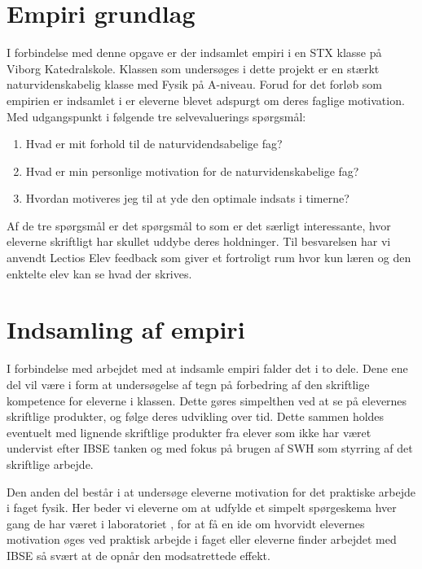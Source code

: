 \section{Empiri grundlag}
I forbindelse med denne opgave er der indsamlet empiri i en STX klasse på Viborg Katedralskole. Klassen som undersøges i dette projekt er en stærkt naturvidenskabelig klasse med Fysik på A-niveau. Forud for det forløb som empirien er indsamlet i er eleverne blevet adspurgt om deres faglige motivation. Med udgangspunkt i følgende tre selvevaluerings spørgsmål:
\begin{enumerate}
	\item Hvad er mit forhold til de naturvidendsabelige fag?
	\item Hvad er min personlige motivation for de naturvidenskabelige fag?
	\item Hvordan motiveres jeg til at yde den optimale indsats i timerne?
\end{enumerate}
Af de tre spørgsmål er det spørgsmål to som er det særligt interessante, hvor eleverne skriftligt har skullet uddybe deres holdninger. Til besvarelsen har vi anvendt Lectios Elev feedback som giver et fortroligt rum hvor kun læren og den enktelte elev kan se hvad der skrives. 

\section{Indsamling af empiri}
I forbindelse med arbejdet med at indsamle empiri falder det i to dele. Dene ene del vil være i form at undersøgelse af tegn på forbedring af den skriftlige kompetence for eleverne i klassen. Dette gøres simpelthen ved at se på elevernes skriftlige produkter, og følge deres udvikling over tid. Dette sammen holdes eventuelt med lignende skriftlige produkter fra elever som ikke har været undervist efter IBSE tanken og med fokus på brugen af SWH som styrring af det skriftlige arbejde.

Den anden del består i at undersøge eleverne motivation for det praktiske arbejde i faget fysik. Her beder vi eleverne om at udfylde et simpelt spørgeskema hver gang de har været i laboratoriet , for at få en ide om hvorvidt elevernes motivation øges ved praktisk arbejde i faget eller eleverne finder arbejdet med IBSE så svært at de opnår den modsatrettede effekt.

